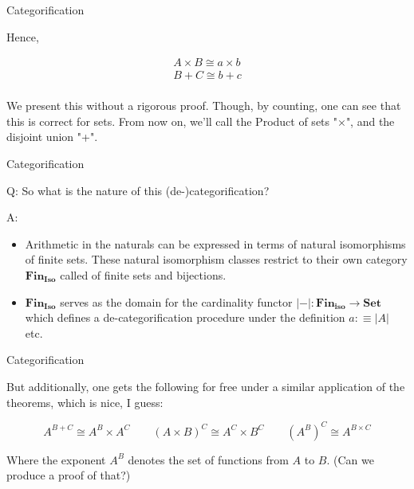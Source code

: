 \documentclass[tikz]{beamer}
\theoremstyle{definition}
\begin{document}
\begin{frame}{Categorification}

Hence, 

\begin{block}{}
\begin{gather*}
    A \times B \cong a \times b \\
    B + C \cong b + c
    \\
\end{gather*}
\end{block}

We present this without a rigorous proof. Though, by counting, one can see that this is correct for sets. From now on, we'll call the Product of sets "$\times$", and the disjoint union "+".
    
\end{frame}

\begin{frame}{Categorification}

\begin{block}{}
    Q: So what is the nature of this (de-)categorification? 

    A: \begin{itemize}
        \item Arithmetic in the naturals can be expressed in terms of natural isomorphisms of finite sets. These  natural isomorphism classes restrict to their own category $\mathbf{Fin_{Iso}}$ called of finite sets and bijections. 
        \item $\mathbf{Fin_{Iso}}$ serves as the domain for the cardinality functor $|-|: \mathbf{Fin_{iso}} \to \mathbf{Set}$ which defines  a de-categorification procedure under the definition $a :\equiv |A|$ etc.
    \end{itemize}{}
\end{block}

\end{frame}{}

\begin{frame}{Categorification}

    But additionally, one gets the following for free under a similar application of the theorems, which is nice, I guess:
    
    \begin{block}{}
        \begin{equation*}
            A^{B + C} \cong A^B \times A^C \qquad (A \times B)^C \cong A^C \times B^C \qquad (A^B)^C \cong A^{B \times C}
        \end{equation*}{}
    \end{block}
    
    Where the exponent $A^B$ denotes the set of functions from $A$ to $B$. (Can we produce a proof of that?)
\end{frame}{}
\end{document}
